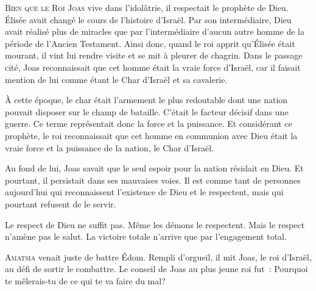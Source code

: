 \lettrine{B}{ien que le Roi Joas} vive dans l'idolâtrie,
 il respectait le prophète de Dieu.
 Élisée avait changé le cours de l'histoire d'Israël.
 Par son intermédiaire, Dieu avait réalisé plus de miracles
 que par l'intermédiaire d'aucun autre homme de la période
 de l'Ancien Testament.
 Ainsi donc, quand le roi apprit qu'Élisée était mourant,
 il vint lui rendre visite et se mit à pleurer de chagrin.
 Dans le passage cité, Joas reconnaissait que cet homme était
 la vraie force d'Israël, car il faisait mention de lui comme étant
 \og le Char d'Israël et sa cavalerie. \fg{}

À cette époque, le char était l'armement le plus redoutable
 dont une nation pouvait disposer sur le champ de bataille.
 C'était le facteur décisif dans une guerre.
 Ce terme représentait donc la force et la puissance.
 Et considérant ce prophète, le roi reconnaissait que cet homme
 en communion avec Dieu était la vraie force et la puissance
 de la nation, le \og Char d'Israël. \fg{}

Au fond de lui, Joas savait que le seul espoir pour la nation
 résidait en Dieu. Et pourtant, il persistait dans ses mauvaises voies.
 Il est comme tant de personnes aujourd'hui qui reconnaissent
 l'existence de Dieu et le respectent, mais qui pourtant refusent de le servir.


Le respect de Dieu ne suffit pas. Même les démons le respectent.
 Mais le respect n'amène pas le salut.
 La victoire totale n'arrive que par l'engagement total. 

\dvrule







\lettrine{A}{matsia} venait juste de battre Édom.
 Rempli d'orgueil, il mit Joas, le roi d'Israël,
 au défi de sortir le combattre.
 Le conseil de Joas au plus jeune roi fut~:
 \og Pourquoi te mêlerais-tu de ce qui te va faire du mal? \fg{}


